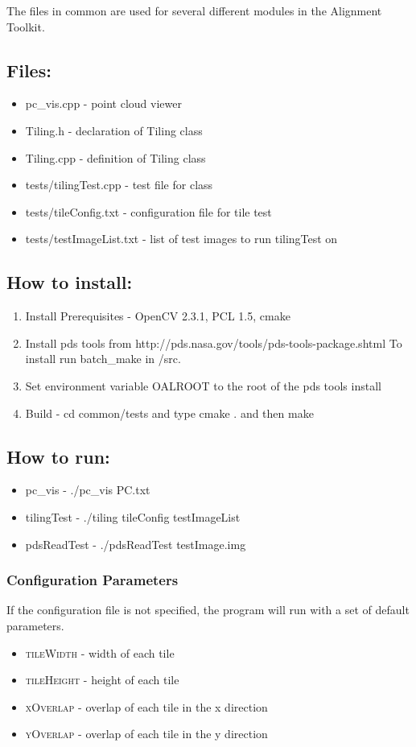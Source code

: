 The files in common are used for several different modules in the Alignment Toolkit.

\subsection{Files:}
\begin{itemize}
\item{pc\_vis.cpp} - point cloud viewer
\item{Tiling.h} - declaration of Tiling class
\item{Tiling.cpp} - definition of Tiling class
\item{tests/tilingTest.cpp} - test file for class
\item{tests/tileConfig.txt} - configuration file for tile test
\item{tests/testImageList.txt} - list of test images to run tilingTest on
\end{itemize}

\subsection{How to install:}
\begin{enumerate}
	\item{Install Prerequisites} - OpenCV 2.3.1, PCL 1.5, cmake 
   \item{Install} pds tools from http://pds.nasa.gov/tools/pds-tools-package.shtml To install run batch\_make in /src. 
   \item{Set} environment variable OALROOT to the root of the pds tools install
	\item{Build} - cd common/tests and type cmake . and then make
\end{enumerate}

\subsection{How to run:}
\begin{itemize}
	\item{pc\_vis} - ./pc\_vis PC.txt
	\item{tilingTest} - ./tiling tileConfig testImageList
	\item{pdsReadTest} - ./pdsReadTest testImage.img
\end{itemize}
\subsubsection{Configuration Parameters}
If the configuration file is not specified, the program will run with a set of default parameters.
\begin{itemize}
	\item{\textsc{tileWidth}} - width of each tile
	\item{\textsc{tileHeight}} - height of each tile
	\item{\textsc{xOverlap}} - overlap of each tile in the x direction
	\item{\textsc{yOverlap}} - overlap of each tile in the y direction
\end{itemize}



